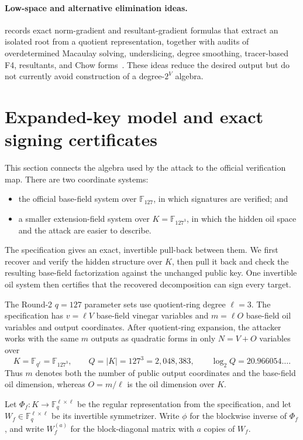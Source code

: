 \documentclass[11pt,a4paper]{article}
\theoremstyle{definition}
\theoremstyle{remark}
\newcommand{\F}{\mathbb F}
\begin{document}
\paragraph{Low-space and alternative elimination ideas.}
 records exact norm-gradient and resultant-gradient formulas that extract an isolated root from a quotient representation, together with audits of overdetermined Macaulay solving, underslicing, degree smoothing, tracer-based F4, resultants, and Chow forms~\cite{BaurStrassen,DAndreaDickenstein,JeronimoEtAl,NeigerEtAl,DegreeSmoothing,F4Tracer}.  These ideas reduce the desired output but do not currently avoid construction of a degree-$2^V$ algebra.

\section{Expanded-key model and exact signing certificates}\label{sec:model}

This section connects the algebra used by the attack to the official verification map.  There are two coordinate systems:
\begin{itemize}
\item the official base-field system over $\F_{127}$, in which signatures are verified; and
\item a smaller extension-field system over $K=\F_{127^3}$, in which the hidden oil space and the attack are easier to describe.
\end{itemize}
The specification gives an exact, invertible pull-back between them.  We first recover and verify the hidden structure over $K$, then pull it back and check the resulting base-field factorization against the unchanged public key.  One invertible oil system then certifies that the recovered decomposition can sign every target.

The Round-2 $q=127$ parameter sets use quotient-ring degree $\ell=3$.  The specification has $v=\ell V$ base-field vinegar variables and $m=\ell O$ base-field oil variables and output coordinates.  After quotient-ring expansion, the attacker works with the same $m$ outputs as quadratic forms in only $N=V+O$ variables over
\[
K=\F_{q^\ell}=\F_{127^3},\qquad Q=|K|=127^3=2{,}048{,}383,
\qquad \log_2 Q=20.966054\ldots.
\]
Thus $m$ denotes both the number of public output coordinates and the base-field oil dimension, whereas $O=m/\ell$ is the oil dimension over $K$.

Let $\Phi_f:K\to\F_q^{\ell\times\ell}$ be the regular representation from the specification, and let $W_f\in\F_q^{\ell\times\ell}$ be its invertible symmetrizer.  Write $\phi$ for the blockwise inverse of $\Phi_f$, and write $W_f^{(a)}$ for the block-diagonal matrix with $a$ copies of $W_f$.
\end{document}
